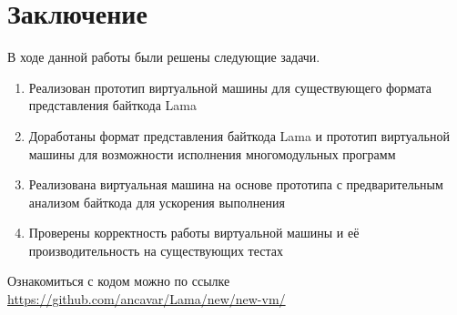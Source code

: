 
\section*{Заключение}
  В ходе данной работы были решены следующие задачи.
    \begin{enumerate}
        \item Реализован прототип виртуальной машины для существующего формата представления байткода Lama
        \item Доработаны формат представления байткода Lama и прототип виртуальной машины для возможности исполнения многомодульных программ
        \item Реализована виртуальная машина на основе прототипа с предварительным анализом байткода для ускорения выполнения
        \item Проверены корректность работы виртуальной машины и её производительность на существующих тестах
    \end{enumerate}

Ознакомиться с кодом можно по ссылке \url{https://github.com/ancavar/Lama/new/new-vm/}

